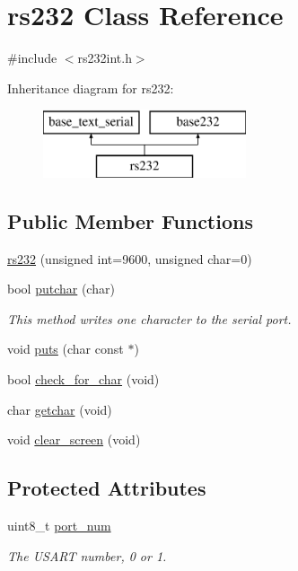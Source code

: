 \hypertarget{classrs232}{\section{rs232 Class Reference}
\label{classrs232}
}


{\ttfamily \#include $<$rs232int.\-h$>$}

Inheritance diagram for rs232\-:\begin{figure}[H]
\begin{center}
\leavevmode
\includegraphics[height=2.000000cm]{classrs232}
\end{center}
\end{figure}
\subsection*{Public Member Functions}
\begin{DoxyCompactItemize}
\item 
\hyperlink{classrs232_ad56e2f28cf22cf06575b2a7d48cf4008}{rs232} (unsigned int=9600, unsigned char=0)
\item 
bool \hyperlink{classrs232_affe1fefe275bc096bf4c3b40b7337aa9}{putchar} (char)
\begin{DoxyCompactList}\small\item\em This method writes one character to the serial port. \end{DoxyCompactList}\item 
void \hyperlink{classrs232_a419947805ca5bfe9b3d3181af653b2b8}{puts} (char const $\ast$)
\item 
bool \hyperlink{classrs232_a66aea4f98b929ce8ba8991bcaab480c8}{check\-\_\-for\-\_\-char} (void)
\item 
char \hyperlink{classrs232_a301cf4f396edd33e1e1b9af74d28c481}{getchar} (void)
\item 
void \hyperlink{classrs232_a5e17a9e3a1b26e91c55cdd535116dc74}{clear\-\_\-screen} (void)
\end{DoxyCompactItemize}
\subsection*{Protected Attributes}
\begin{DoxyCompactItemize}
\item 
\hypertarget{classrs232_a48034d9132dfba0f9e99c88bce4b06cd}{uint8\-\_\-t \hyperlink{classrs232_a48034d9132dfba0f9e99c88bce4b06cd}{port\-\_\-num}}\label{classrs232_a48034d9132dfba0f9e99c88bce4b06cd}

\begin{DoxyCompactList}\small\item\em The U\-S\-A\-R\-T number, 0 or 1. \end{DoxyCompactList}\end{DoxyCompactItemize}


